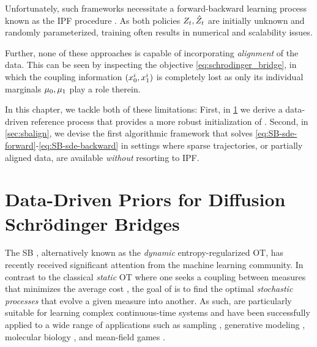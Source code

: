 Unfortunately, such frameworks necessitate a forward-backward learning process known as the \acrfull{IPF} procedure \citep{fortet1940resolution, kullback1968probability}.
As both policies $Z_t, \hat{Z}_t$ are initially unknown and randomly parameterized, training  often results in numerical and scalability issues.

Further, none of these approaches is capable of incorporating \emph{alignment} of the data. This can be seen by inspecting the objective \eqref{eq:schrodinger_bridge}, in which the coupling information $(x_0^i,x_1^i)$ is completely lost as only its individual marginals $\mu_0,\mu_1$ play a role therein.  

In this chapter, we tackle both of these limitations: First, in \cref{sec:gsbflow} we derive a data-driven reference process that provides a more robust initialization of . Second, in \cref{sec:sbalign}, we devise the first algorithmic framework that solves \eqref{eq:SB-sde-forward}-\eqref{eq:SB-sde-backward} in settings where sparse trajectories, or partially aligned data, are available \emph{without} resorting to \acrshort{IPF}.

\section{Data-Driven Priors for Diffusion Schr{\"o}dinger Bridges} \label{sec:gsbflow}

The \acrlong{SB} \citep{leonard2013survey, chen2021stochastic}, alternatively known as the \emph{dynamic} entropy-regularized \acrlong{OT}, has recently received significant attention from the machine learning community. In contrast to the classical \emph{static} \acrshort{OT} where one seeks a coupling between measures that minimizes the average cost \citep{villani2009optimal,peyre2019computational}, the goal of  is to find the optimal \emph{stochastic processes} that evolve a given measure into another. As such,  are particularly suitable for learning complex continuous-time systems and have been successfully applied to a wide range of applications such as sampling \citep{bernton2019schr, huang2021schrodinger}, generative modeling \citep{chen2021likelihood,de2021diffusion,wang2021deep}, molecular biology \citep{holdijk2022path}, and mean-field games \citep{liu2022deep}. 



